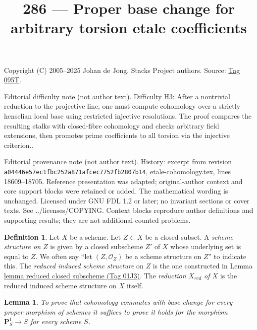 \documentclass{amsart}
\theoremstyle{plain}
\newtheorem{lemma}[subsection]{Lemma}
\theoremstyle{definition}
\newtheorem{definition}[subsection]{Definition}
\theoremstyle{remark}
\numberwithin{equation}{subsection}
\begin{document}
\title[Stacks Project, Tag 095T]{286 --- Proper base change for arbitrary torsion etale coefficients}
\maketitle
\noindent Copyright (C) 2005--2025 Johan de Jong. Stacks Project authors. Source: \href{https://stacks.math.columbia.edu/tag/095T}{Tag 095T}.

\noindent Editorial difficulty note (not author text). Difficulty H3: After a nontrivial reduction to the projective line, one must compute cohomology over a strictly henselian local base using restricted injective resolutions. The proof compares the resulting stalks with closed-fibre cohomology and checks arbitrary field extensions, then promotes prime coefficients to all torsion via the injective criterion..

\noindent Editorial provenance note (not author text). History: excerpt from revision \texttt{a0444\allowbreak 6e57e\allowbreak c1fbc\allowbreak 252a8\allowbreak 71afc\allowbreak ec775\allowbreak 2fb28\allowbreak 07b14}, etale-cohomology.tex, lines 18609--18705. Reference presentation was adapted; original-author context and core support blocks were retained or added. The mathematical wording is unchanged. Licensed under GNU FDL 1.2 or later; no invariant sections or cover texts. See ../licenses/COPYING. Context blocks reproduce author definitions and supporting results; they are not additional counted problems.

\begin{definition}
\label{schemes-definition-reduced-induced-scheme}
Let $X$ be a scheme. Let $Z \subset X$ be a closed subset.
A {\it scheme structure on $Z$} is given by a closed subscheme $Z'$ of
$X$ whose underlying set is equal to $Z$. We often say
``let $(Z, \mathcal{O}_Z)$ be a scheme structure on $Z$'' to
indicate this. The {\it reduced induced scheme structure}
on $Z$ is the one constructed in Lemma \href{https://stacks.math.columbia.edu/tag/01J3}{lemma reduced closed subscheme (Tag 01J3)}.
The {\it reduction $X_{red}$ of $X$} is the reduced induced scheme
structure on $X$ itself.
\end{definition}

\begin{lemma}
\label{lemma-reduce-to-P1}
To prove that cohomology commutes with base change for
every proper morphism of schemes it suffices to prove it
holds for the morphism $\mathbf{P}^1_S \to S$ for every scheme $S$.
\end{lemma}
\end{document}
